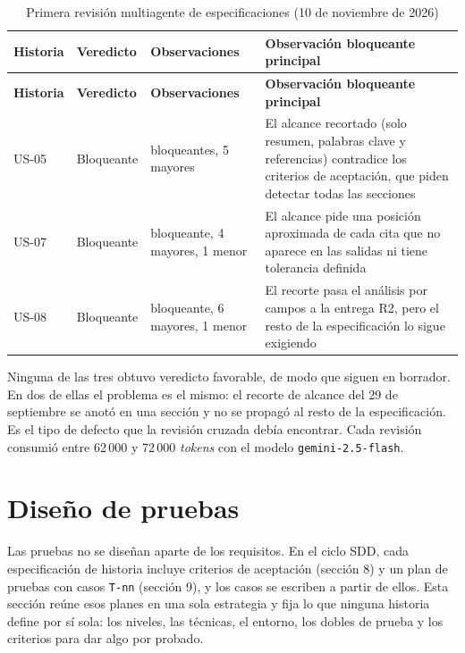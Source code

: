 {\small
\begin{longtable}{@{}>{\raggedright\arraybackslash}p{}>{\raggedright\arraybackslash}p{}>{\raggedright\arraybackslash}p{}>{\raggedright\arraybackslash}p{}@{}}
\caption{Primera revisión multiagente de especificaciones (10 de noviembre de 2026)}\label{tab:3-17}\\
\toprule
\textbf{Historia} & \textbf{Veredicto} & \textbf{Observaciones} & \textbf{Observación bloqueante principal} \\
\midrule
\endfirsthead
\toprule
\textbf{Historia} & \textbf{Veredicto} & \textbf{Observaciones} & \textbf{Observación bloqueante principal} \\
\midrule
\endhead
\bottomrule
\endfoot
\endlastfoot
US-05 & Bloqueante & 2 bloqueantes, 5 mayores & El alcance recortado (solo resumen, palabras clave y referencias) contradice los criterios de aceptación, que piden detectar todas las secciones \\
US-07 & Bloqueante & 1 bloqueante, 4 mayores, 1 menor & El alcance pide una posición aproximada de cada cita que no aparece en las salidas ni tiene tolerancia definida \\
US-08 & Bloqueante & 1 bloqueante, 6 mayores, 1 menor & El recorte pasa el análisis por campos a la entrega R2, pero el resto de la especificación lo sigue exigiendo \\
\end{longtable}
}

Ninguna de las tres obtuvo veredicto favorable, de modo que siguen en borrador. En dos de ellas el problema es el mismo: el recorte de alcance del 29 de septiembre se anotó en una sección y no se propagó al resto de la especificación. Es el tipo de defecto que la revisión cruzada debía encontrar. Cada revisión consumió entre 62\,000 y 72\,000 \emph{tokens} con el modelo \texttt{gemini-2.5-flash}. 


\section{Diseño de pruebas}\label{sec:pruebas}

Las pruebas no se diseñan aparte de los requisitos. En el ciclo SDD, cada especificación de historia incluye criterios de aceptación (sección 8) y un plan de pruebas con casos \texttt{T-nn} (sección 9), y los casos se escriben a partir de ellos. Esta sección reúne esos planes en una sola estrategia y fija lo que ninguna historia define por sí sola: los niveles, las técnicas, el entorno, los dobles de prueba y los criterios para dar algo por probado.

